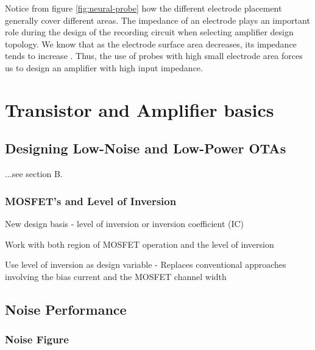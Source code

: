     Notice from figure \ref{fig:neural-probe} how the different electrode placement generally cover different areas. The impedance of an electrode plays an 
    important role during the design of the recording circuit when selecting amplifier design topology. We know that as the electrode surface 
    area decreases, its impedance tends to increase \cite{yoo2011biomedical-cmos}. Thus, the use of probes with high small electrode area
    forces us to design an amplifier with high input impedance.
   
   
   \section{Transistor and Amplifier basics}
    \label{subsec:trans-amp-basics}
      \subsection{Designing Low-Noise and Low-Power \acs{OTA}s}
	...see \cite{harrison2003low} section B.
      
	  \subsubsection{MOSFET's and Level of Inversion}
	  New design basis  -   level of inversion or inversion coefficient (IC)
	  
	  Work with both region of MOSFET operation and the level of inversion

	  Use level of inversion as design variable
	   - Replaces conventional approaches involving the bias current and the MOSFET channel width
	   
	   
      \subsection{Noise Performance}
	\subsubsection{Noise Figure}
        
        
